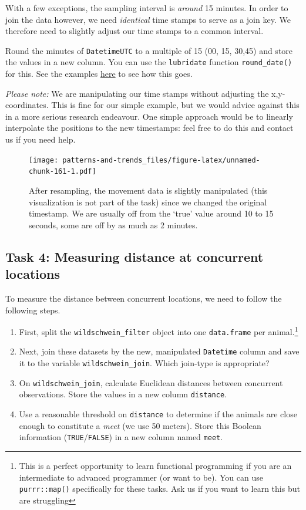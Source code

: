 \documentclass[]{book}
\providecommand{\tightlist}{%
  \setlength{\itemsep}{0pt}\setlength{\parskip}{0pt}}
\let\rmarkdownfootnote\footnote%
\def\footnote{\protect\rmarkdownfootnote}
\begin{document}
With a few exceptions, the sampling interval is \emph{around} 15
minutes. In order to join the data however, we need \emph{identical}
time stamps to serve as a join key. We therefore need to slightly adjust
our time stamps to a common interval.

Round the minutes of \texttt{DatetimeUTC} to a multiple of 15 (00, 15,
30,45) and store the values in a new column. You can use the
\texttt{lubridate} function \texttt{round\_date()} for this. See the
examples
\href{https://lubridate.tidyverse.org/reference/round_date.html}{here}
to see how this goes.

\emph{Please note:} We are manipulating our time stamps without
adjusting the x,y-coordinates. This is fine for our simple example, but
we would advice against this in a more serious research endeavour. One
simple approach would be to linearly interpolate the positions to the
new timestamps: feel free to do this and contact us if you need help.

\begin{figure}
\centering
\texttt{[image: patterns-and-trends\_files/figure-latex/unnamed-chunk-161-1.pdf]}
\caption{\label{fig:unnamed-chunk-161}After resampling, the movement data is
slightly manipulated (this visualization is not part of the task) since
we changed the original timestamp. We are usually off from the `true'
value around 10 to 15 seconds, some are off by as much as 2 minutes.}
\end{figure}

\subsection{Task 4: Measuring distance at concurrent
locations}\label{task-4-measuring-distance-at-concurrent-locations}

To measure the distance between concurrent locations, we need to follow
the following steps.

\begin{enumerate}
\def\labelenumi{\arabic{enumi}.}
\tightlist
\item
  First, split the \texttt{wildschwein\_filter} object into one
  \texttt{data.frame} per animal.\footnote{This is a perfect opportunity
    to learn functional programming if you are an intermediate to
    advanced programmer (or want to be). You can use
    \texttt{purrr::map()} specifically for these tasks. Ask us if you
    want to learn this but are struggling}
\item
  Next, join these datasets by the new, manipulated \texttt{Datetime}
  column and save it to the variable \texttt{wildschwein\_join}. Which
  join-type is appropriate?
\item
  On \texttt{wildschwein\_join}, calculate Euclidean distances between
  concurrent observations. Store the values in a new column
  \texttt{distance}.
\item
  Use a reasonable threshold on \texttt{distance} to determine if the
  animals are close enough to constitute a \emph{meet} (we use 50
  meters). Store this Boolean information (\texttt{TRUE}/\texttt{FALSE})
  in a new column named \texttt{meet}.
\end{enumerate}
\end{document}
